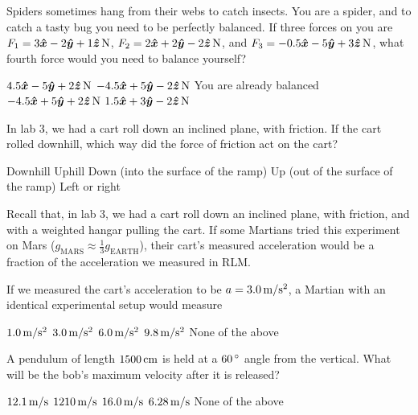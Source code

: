 \documentclass[answers]{exam}
\newcommand{\degree}{^\circ}
\begin{document}
\begin{questions}
\question Spiders sometimes hang from their webs to catch insects. You are a spider, and to catch a tasty bug you need to be perfectly balanced. If three forces on you are $F_1 = \unit[3\boldsymbol{\hat{x}} - 2\boldsymbol{\hat{y}} + 1\boldsymbol{\hat{z}}]{N}$, $F_2 = \unit[2\boldsymbol{\hat{x}} + 2\boldsymbol{\hat{y}} - 2\boldsymbol{\hat{z}}]{N}$, and $F_3 = \unit[-0.5\boldsymbol{\hat{x}} - 5\boldsymbol{\hat{y}} + 3\boldsymbol{\hat{z}}]{N}$, what fourth force would you need to balance yourself?
\begin{choices}
\choice $\unit[4.5\boldsymbol{\hat{x}} - 5\boldsymbol{\hat{y}} + 2\boldsymbol{\hat{z}}]{N}$
\CorrectChoice $\unit[-4.5\boldsymbol{\hat{x}} + 5\boldsymbol{\hat{y}} - 2\boldsymbol{\hat{z}}]{N}$ 
\choice You are already balanced
\choice $\unit[-4.5\boldsymbol{\hat{x}} + 5\boldsymbol{\hat{y}} + 2\boldsymbol{\hat{z}}]{N}$
\choice $\unit[1.5\boldsymbol{\hat{x}} + 3\boldsymbol{\hat{y}} - 2\boldsymbol{\hat{z}}]{N}$
\end{choices}

\question In lab 3, we had a cart roll down an inclined plane, with friction. If the cart rolled downhill, which way did the force of friction act on the cart?
\begin{choices}
\choice Downhill
\CorrectChoice Uphill 
\choice Down (into the surface of the ramp)
\choice Up (out of the surface of the ramp)
\choice Left or right
\end{choices}

\question Recall that, in lab 3, we had a cart roll down an inclined plane, with friction, and with a weighted hangar pulling the cart. If some Martians tried this experiment on Mars ($g_\textrm{MARS} \approx \frac{1}{3} g_\textrm{EARTH}$), their cart's measured acceleration would be a fraction of the acceleration we measured in RLM.

If we measured the cart's acceleration to be $a = \unit[3.0]{m/s^2}$, a Martian with an identical experimental setup would measure
\begin{choices}
\CorrectChoice $\unit[1.0]{m/s^2}$ 
\choice $\unit[3.0]{m/s^2}$
\choice $\unit[6.0]{m/s^2}$
\choice $\unit[9.8]{m/s^2}$
\choice None of the above
\end{choices}

\question A pendulum of length $\unit[1500]{cm}$ is held at a $\unit[60]{\degree}$ angle from the vertical. What will be the bob's maximum velocity after it is released?
\begin{choices}
\CorrectChoice $\unit[12.1]{m/s}$ 
\choice $\unit[1210]{m/s}$
\choice $\unit[16.0]{m/s}$
\choice $\unit[6.28]{m/s}$
\choice None of the above
\end{choices}


\end{questions}
\end{document}
